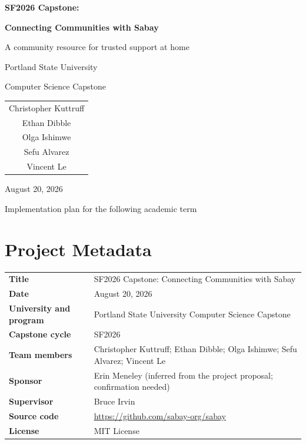 \documentclass[11pt]{article}
\begin{document}
\hypersetup{pageanchor=false}
\begin{titlepage}
  \pagecolor{SabayCream}
  \color{SabayBrown}
  \centering
  \vspace*{1.1in}
  {\Huge\bfseries SF2026 Capstone:\par}
  \vspace{0.18in}
  {\Huge\bfseries Connecting Communities with Sabay\par}
  \vspace{0.35in}
  {\Large A community resource for trusted support at home\par}
  \vfill
  {\large Portland State University\par}
  {\large Computer Science Capstone\par}
  \vspace{0.4in}
  \begin{tabular}{c}
    Christopher Kuttruff \\
    Ethan Dibble \\
    Olga Ishimwe \\
    Sefu Alvarez \\
    Vincent Le
  \end{tabular}
  \vspace{0.45in}

  {\large August 20, 2026\par}
  \vspace{0.7in}
  {\small Implementation plan for the following academic term\par}
  \pagecolor{white}
\end{titlepage}

\hypersetup{pageanchor=true}

\section{Project Metadata}

\begin{tabularx}{\textwidth}{>{\bfseries}p{}X}
\toprule
Title & SF2026 Capstone: Connecting Communities with Sabay \\
Date & August 20, 2026 \\
University and program & Portland State University Computer Science Capstone \\
Capstone cycle & SF2026 \\
Team members & Christopher Kuttruff; Ethan Dibble; Olga Ishimwe; Sefu Alvarez; Vincent Le \\
Sponsor & Erin Meneley (inferred from the project proposal; confirmation needed) \\
Supervisor & Bruce Irvin\\
Source code & \url{https://github.com/sabay-org/sabay} \\
License & MIT License \\
\bottomrule
\end{tabularx}
\end{document}
